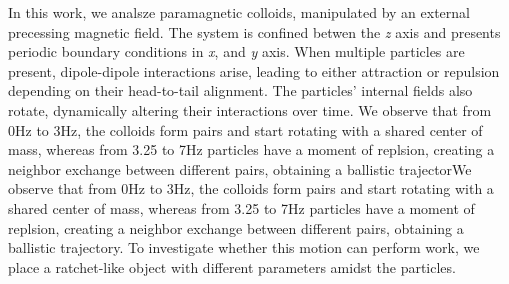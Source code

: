 In this work, we analsze paramagnetic colloids, manipulated by an external precessing magnetic field. The system is confined betwen the \textit{z} axis and presents periodic boundary conditions in \textit{x}, and \textit{y} axis. When multiple particles are present, dipole-dipole interactions arise, leading to either attraction or repulsion depending on their head-to-tail alignment. The particles' internal fields also rotate, dynamically altering their interactions over time. We observe that from 0Hz to 3Hz, the colloids form pairs and start rotating with a shared center of mass, whereas from 3.25 to 7Hz particles have a moment of replsion, creating a neighbor exchange between different pairs, obtaining a ballistic trajectorWe observe that from 0Hz to 3Hz, the colloids form pairs and start rotating with a shared center of mass, whereas from 3.25 to 7Hz particles have a moment of replsion, creating a neighbor exchange between different pairs, obtaining a ballistic trajectory. To investigate whether this motion can perform work, we place a ratchet-like object with different parameters amidst the particles.

\newpage %

\listoffigures
{}

\listoftables
{}

\tableofcontents
\newpage

